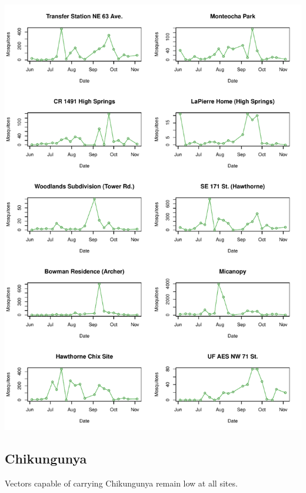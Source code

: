 \documentclass{article}
\begin{document}
\begin{center}
\includegraphics{mosq04nov13-010}
\newpage
\subsection*{Chikungunya}

\end{center}

Vectors capable of carrying Chikungunya remain low at all sites.\\
\end{document}
